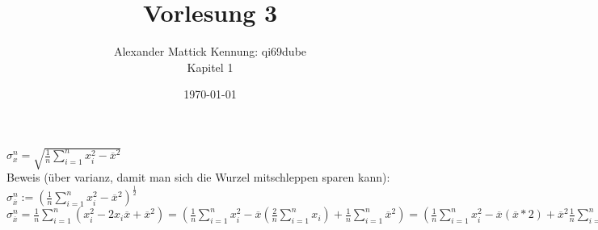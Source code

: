 \documentclass{article}
\author{
Alexander Mattick Kennung: qi69dube\\
Kapitel 1
}
\date{\today}
\title{Vorlesung 3}
\begin{document}
	\maketitle
	$\sigma_x^n = \sqrt{\frac{1}{n}\sum\limits^n_{i=1} x_i^2-\overline{x}^2}$\\
	Beweis (über varianz, damit man sich die Wurzel mitschleppen sparen kann):\\
	$\sigma_{\overline{x}}^n := (\frac{1}{n}\sum\limits^n_{i=1} x_i^2-\overline{x}^2)^\frac{1}{2}$\\
	$\sigma_{\overline{x}}^n = \frac{1}{n}\sum\limits^n_{i=1} (x_i^2-2x_i\overline{x}+\overline{x}^2)=
	(\frac{1}{n}\sum\limits^n_{i=1}x_i^2-\overline{x}(\frac{2}{n}\sum\limits^n_{i=1}x_i)+\frac{1}{n}\sum\limits^n_{i=1}\overline{x}^2) 
	= (\frac{1}{n}\sum\limits^n_{i=1}x_i^2-\overline{x}(\overline{x}*2)+\overline{x}^2\frac{1}{n}\sum\limits^n_{i=1}1)
	=\frac{1}{n}\sum\limits^n_{i=1}x_i^2-\overline{x}(\overline{x}*2)+\overline{x}^2 =
	 \sum\limits^n_{i=1}x_i^2-\overline{x}^2$
\end{document}
